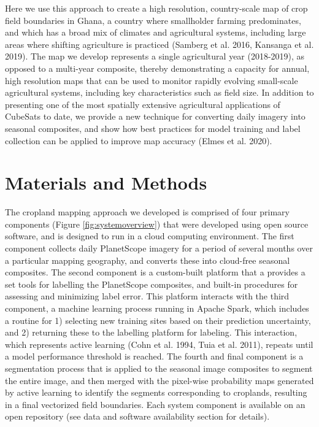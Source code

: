 \documentclass[11pt,a4paper]{article}
\begin{document}
Here we use this approach to create a high resolution, country-scale map
of crop field boundaries in Ghana, a country where smallholder farming
predominates, and which has a broad mix of climates and agricultural
systems, including large areas where shifting agriculture is practiced
(Samberg et al. 2016, Kansanga et al. 2019). The map we develop
represents a single agricultural year (2018-2019), as opposed to a
multi-year composite, thereby demonstrating a capacity for annual, high
resolution maps that can be used to monitor rapidly evolving small-scale
agricultural systems, including key characteristics such as field size.
In addition to presenting one of the most spatially extensive
agricultural applications of CubeSats to date, we provide a new
technique for converting daily imagery into seasonal composites, and
show how best practices for model training and label collection can be
applied to improve map accuracy (Elmes et al. 2020).

\hypertarget{materials-and-methods}{%
\section{Materials and Methods}\label{materials-and-methods}}

The cropland mapping approach we developed is comprised of four primary
components (Figure \ref{fig:systemoverview}) that were developed using
open source software, and is designed to run in a cloud computing
environment. The first component collects daily PlanetScope imagery for
a period of several months over a particular mapping geography, and
converts these into cloud-free seasonal composites. The second component
is a custom-built platform that a provides a set tools for labelling the
PlanetScope composites, and built-in procedures for assessing and
minimizing label error. This platform interacts with the third
component, a machine learning process running in Apache Spark, which
includes a routine for 1) selecting new training sites based on their
prediction uncertainty, and 2) returning these to the labelling platform
for labeling. This interaction, which represents active learning (Cohn
et al. 1994, Tuia et al. 2011), repeats until a model performance
threshold is reached. The fourth and final component is a segmentation
process that is applied to the seasonal image composites to segment the
entire image, and then merged with the pixel-wise probability maps
generated by active learning to identify the segments corresponding to
croplands, resulting in a final vectorized field boundaries. Each system
component is available on an open repository (see data and software
availability section for details).
\end{document}

